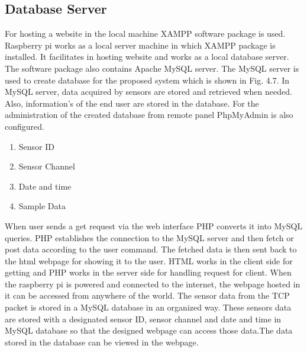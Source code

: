 \subsection{Database Server}
For hosting a website in the local machine XAMPP software package is used. Raspberry pi
works as a local server machine in which XAMPP package is installed. It facilitates in hosting website and works as a local database server. The software package also contains Apache MySQL server. The MySQL server is used to create database for the proposed system which is shown in Fig. 4.7. In MySQL server, data acquired by sensors are stored and retrieved when needed. Also, information’s of the end user are stored in the database. For the administration of the created database from remote panel PhpMyAdmin is also configured.
\begin{enumerate}
  \item Sensor ID
  \item Sensor Channel
  \item Date and time
  \item Sample Data
\end{enumerate}
When user sends a get request via the web interface PHP converts it into MySQL queries. PHP establishes the connection to the MySQL server and then fetch or post data according to the user command. The fetched data is then sent back to the html webpage for showing it to the user. HTML works in the client side for getting and PHP works in the server side for handling request for client. When the raspberry pi is powered and connected to the internet, the webpage hosted in it can be accessed from anywhere of the world. The sensor data from the TCP packet is stored in a MySQL database in an organized way. These sensors data are stored with a designated sensor ID, sensor channel and date and time in MySQL database so that the designed webpage can access those data.The data stored in the database can be viewed in the webpage.

